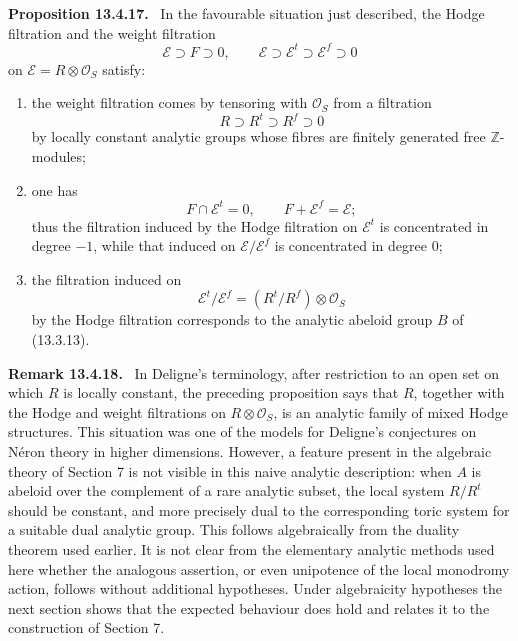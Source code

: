 \documentclass[11pt]{article}
\providecommand{\cO}{\mathcal O}
\providecommand{\Z}{\mathbb Z}
\providecommand{\cE}{\mathcal E}
\newenvironment{statement}[1]{\par\medskip\noindent\textbf{#1.}\ }{\par\medskip}
\newenvironment{remarktext}[1]{\par\medskip\noindent\textbf{#1.}\ }{\par\medskip}
\begin{document}
\begin{statement}{Proposition 13.4.17}
In the favourable situation just described, the Hodge filtration and the weight filtration
\begin{equation}\tag{13.4.17.1}
        \cE\supset F\supset0,
        \qquad
        \cE\supset\cE^t\supset\cE^f\supset0
\end{equation}
on \(\cE=R\otimes\cO_S\) satisfy:
\begin{enumerate}[label=\alph*)]
\item the weight filtration comes by tensoring with \(\cO_S\) from a filtration
\[
        R\supset R^t\supset R^f\supset0
\]
by locally constant analytic groups whose fibres are finitely generated free \(\Z\)-modules;
\item one has
\[
        F\cap \cE^t=0,
        \qquad
        F+\cE^f=\cE;
\]
thus the filtration induced by the Hodge filtration on \(\cE^t\) is concentrated in degree \(-1\), while that induced on \(\cE/\cE^f\) is concentrated in degree \(0\);
\item the filtration induced on
\[
        \cE^t/\cE^f=(R^t/R^f)\otimes\cO_S
\]
by the Hodge filtration corresponds to the analytic abeloid group \(B\) of (13.3.13).
\end{enumerate}
\end{statement}

\begin{remarktext}{Remark 13.4.18}
In Deligne's terminology, after restriction to an open set on which \(R\) is locally constant, the preceding proposition says that \(R\), together with the Hodge and weight filtrations on \(R\otimes\cO_S\), is an analytic family of mixed Hodge structures.  This situation was one of the models for Deligne's conjectures on N\'eron theory in higher dimensions.  However, a feature present in the algebraic theory of Section 7 is not visible in this naive analytic description: when \(A\) is abeloid over the complement of a rare analytic subset, the local system \(R/R^t\) should be constant, and more precisely dual to the corresponding toric system for a suitable dual analytic group.  This follows algebraically from the duality theorem used earlier.  It is not clear from the elementary analytic methods used here whether the analogous assertion, or even unipotence of the local monodromy action, follows without additional hypotheses.  Under algebraicity hypotheses the next section shows that the expected behaviour does hold and relates it to the construction of Section 7.
\end{remarktext}
\end{document}
